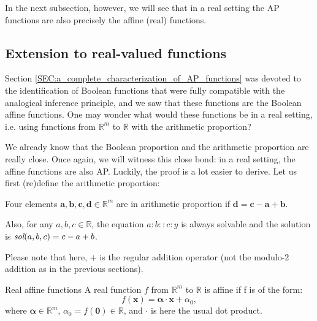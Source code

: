 In the next subsection, however, we will see that in a real setting the AP
functions are also precisely the affine (real) functions.

\subsection{Extension to real-valued functions}
\label{SEC:extension_to_real_valued_functions}

Section \ref{SEC:a_complete_characterization_of_AP_functions} was devoted to the
identification of Boolean functions that were fully compatible with the
analogical inference principle, and we saw that
these functions are the Boolean affine functions. One may wonder what would
these functions be in a real setting, i.e. using functions  from $\mathbb{R}^m$
to $\mathbb{R}$ with the arithmetic proportion?

We already know that the Boolean proportion and the arithmetic proportion
are really close. Once again, we will witness this close bond: in a real
setting, the affine functions are also AP. Luckily, the proof is a lot easier
to derive.  Let us first (re)define the arithmetic proportion:
\begin{property}
  \label{PROPER:sol_arithm_prop}
  Four elements $\mathbf{a}, \mathbf{b}, \mathbf{c}, \mathbf{d} \in
  \mathbb{R}^m$ are in arithmetic proportion if $\mathbf{d} = \mathbf{c} -
  \mathbf{a} + \mathbf{b}$.

  Also, for any $a, b, c \in \mathbb{R}$, the equation $a : b :: c:y$ is always
  solvable and the solution is $\emph{sol}(a, b, c) = c - a + b$.
\end{property}

Please note that here, $+$ is the regular addition operator (not the modulo-2
addition as in the previous sections).

\begin{definition}{Real affine functions}
  \label{DEF:real_affine}
  A real function $f$ from $\mathbb{R}^m$ to $\mathbb{R}$ is affine if f is of
  the form: $$f(\mathbf{x}) = \boldsymbol{\alpha} \cdot \mathbf{x} +
  \alpha_0,$$
  where $\boldsymbol{\alpha} \in \mathbb{R}^m$, $\alpha_0  = f(\mathbf{0})
  \in \mathbb{R}$, and $\cdot$ is here the usual dot product.
\end{definition}

